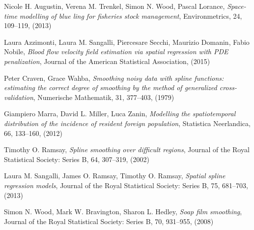 \documentclass[a4paper,11pt,twoside,openright]{book}							%
\begin{document}
\begin{thebibliography}{9}

Nicole H. Augustin, Verena M. Trenkel, Simon N. Wood, Pascal Lorance, \emph{Space-time modelling of blue ling for fisheries stock management}, Environmetrics, 24, 109–119, (2013)

Laura Azzimonti, Laura M. Sangalli, Piercesare Secchi, Maurizio Domanin, Fabio Nobile, \emph{Blood flow velocity field estimation via spatial regression with PDE penalization}, Journal of the American Statistical Association, (2015)

Peter Craven, Grace Wahba, \emph{Smoothing noisy data with spline functions: estimating the correct degree of smoothing by the method of generalized cross-validation}, Numerische Mathematik, 31, 377–403, (1979)

Giampiero Marra, David L. Miller, Luca Zanin, \emph{Modelling the spatiotemporal distribution of the incidence of resident foreign population}, Statistica Neerlandica, 66, 133–160, (2012)

Timothy O. Ramsay, \emph{Spline smoothing over difficult regions}, Journal of the Royal Statistical Society: Series B, 64, 307–319, (2002)

Laura M. Sangalli, James O. Ramsay, Timothy O. Ramsay, \emph{Spatial spline regression models}, Journal of the Royal Statistical Society: Series B, 75, 681–703, (2013)

Simon N. Wood, Mark W. Bravington, Sharon L. Hedley, \emph{Soap film smoothing}, Journal of the Royal Statistical Society: Series B, 70, 931–955, (2008)



\end{thebibliography}
\end{document}
